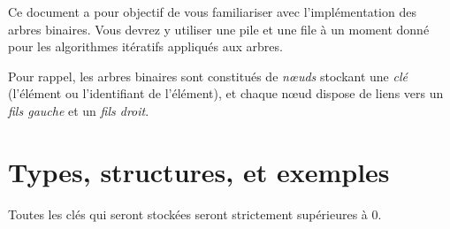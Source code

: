 \documentclass[11pt,a4paper]{article}
\begin{document}
\EncadreTitre

\bigskip


%
%

\bigskip


Ce document a pour objectif de vous familiariser avec l'implémentation des arbres binaires.
Vous devrez y utiliser une pile et une file à un moment donné pour les algorithmes itératifs appliqués aux arbres.

\bigskip

Pour rappel, les arbres binaires sont constitués de \textit{nœuds} stockant une \textit{clé} (l'élément ou l'identifiant de l'élément), et chaque nœud dispose de liens vers un \textit{fils gauche} et un \textit{fils droit}.

\bigskip


\section{Types, structures, et exemples}

\bigskip

Toutes les clés qui seront stockées seront strictement supérieures à 0.



\end{document}
